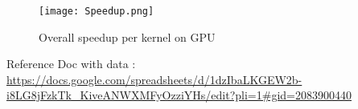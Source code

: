 \documentclass[14pt,fleqn]{article}
\begin{document}
\begin{figure}
\centering
    \texttt{[image: Speedup.png]}
    \caption{Overall speedup per kernel on GPU}
    \label{fig:Speedup}
\end{figure}





Reference Doc with data :
\url{https://docs.google.com/spreadsheets/d/1dzIbaLKGEW2b-i8LG8jFzkTk_KiveANWXMFyOzziYHs/edit?pli=1#gid=2083900440}
\end{document}
